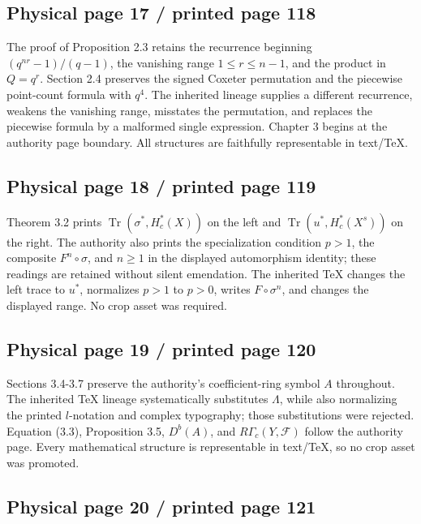 \documentclass[10pt]{article}
\begin{document}
\subsection*{Physical page 17 / printed page 118}

The proof of Proposition 2.3 retains the recurrence beginning \((q^{nr}-1)/(q-1)\), the vanishing range \(1\le r\le n-1\), and the product in \(Q=q^r\). Section 2.4 preserves the signed Coxeter permutation and the piecewise point-count formula with \(q^4\). The inherited lineage supplies a different recurrence, weakens the vanishing range, misstates the permutation, and replaces the piecewise formula by a malformed single expression. Chapter 3 begins at the authority page boundary. All structures are faithfully representable in text/TeX.\par

\subsection*{Physical page 18 / printed page 119}

Theorem 3.2 prints \(\operatorname{Tr}(\sigma^*,H_c^*(X))\) on the left and \(\operatorname{Tr}(u^*,H_c^*(X^s))\) on the right. The authority also prints the specialization condition \(p>1\), the composite \(F^n\circ\sigma\), and \(n\ge1\) in the displayed automorphism identity; these readings are retained without silent emendation. The inherited TeX changes the left trace to \(u^*\), normalizes \(p>1\) to \(p>0\), writes \(F\circ\sigma^n\), and changes the displayed range. No crop asset was required.\par

\subsection*{Physical page 19 / printed page 120}

Sections 3.4-3.7 preserve the authority's coefficient-ring symbol \(A\) throughout. The inherited TeX lineage systematically substitutes \(\Lambda\), while also normalizing the printed \(l\)-notation and complex typography; those substitutions were rejected. Equation (3.3), Proposition 3.5, \(D^b(A)\), and \(R\Gamma_c(Y,\mathcal F)\) follow the authority page. Every mathematical structure is representable in text/TeX, so no crop asset was promoted.\par

\subsection*{Physical page 20 / printed page 121}
\end{document}
